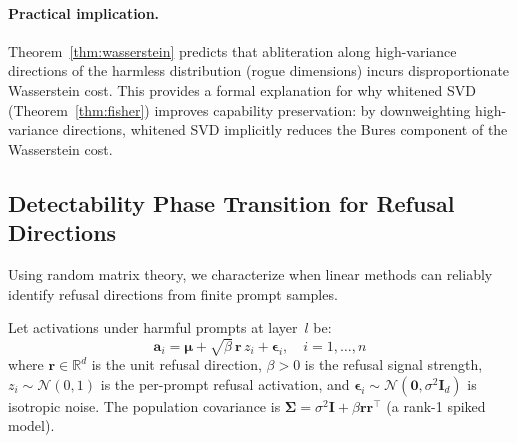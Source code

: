\paragraph{Practical implication.}
Theorem~\ref{thm:wasserstein} predicts that abliteration along high-variance directions of the harmless distribution (rogue dimensions) incurs disproportionate Wasserstein cost.
This provides a formal explanation for why whitened SVD (Theorem~\ref{thm:fisher}) improves capability preservation: by downweighting high-variance directions, whitened SVD implicitly reduces the Bures component of the Wasserstein cost.

\subsection{Detectability Phase Transition for Refusal Directions}
\label{app:phase_transition}

Using random matrix theory, we characterize when linear methods can reliably identify refusal directions from finite prompt samples.

\begin{definition}
\label{def:spiked}
Let activations under harmful prompts at layer~$l$ be:
\begin{equation}
    \mathbf{a}_i = \boldsymbol{\mu} + \sqrt{\beta}\, \mathbf{r}\, z_i + \boldsymbol{\epsilon}_i, \quad i = 1, \ldots, n
\end{equation}
where $\mathbf{r} \in \mathbb{R}^d$ is the unit refusal direction, $\beta > 0$ is the refusal signal strength, $z_i \sim \mathcal{N}(0, 1)$ is the per-prompt refusal activation, and $\boldsymbol{\epsilon}_i \sim \mathcal{N}(\mathbf{0}, \sigma^2\mathbf{I}_d)$ is isotropic noise.
The population covariance is $\boldsymbol{\Sigma} = \sigma^2\mathbf{I} + \beta\mathbf{r}\mathbf{r}^\top$ (a rank-1 spiked model).
\end{definition}

